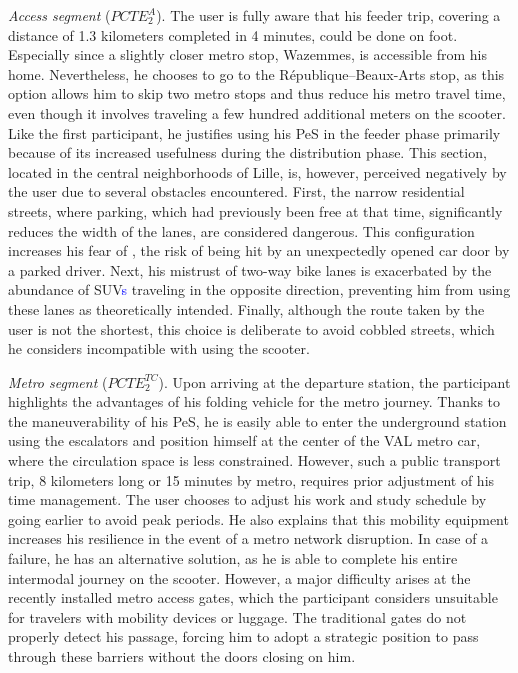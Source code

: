 \begin{refsegment}
\textsl{Access segment} (\(PCTE^{A}_{2}\)). The user is fully aware that his feeder trip, covering a distance of 1.3 kilometers completed in 4 minutes, could be done on foot. Especially since a slightly closer metro stop, Wazemmes, is accessible from his home. Nevertheless, he chooses to go to the République–Beaux-Arts stop, as this option allows him to skip two metro stops and thus reduce his metro travel time, even though it involves traveling a few hundred additional meters on the scooter. Like the first participant, he justifies using his \acrshort{PeS} in the feeder phase primarily because of its increased usefulness during the distribution phase. This section, located in the central neighborhoods of Lille, is, however, perceived negatively by the user due to several obstacles encountered. First, the narrow residential streets, where parking, which had previously been free at that time, significantly reduces the width of the lanes, are considered dangerous. This configuration increases his fear of , the risk of being hit by an unexpectedly opened car door by a parked driver. Next, his mistrust of two-way bike lanes is exacerbated by the abundance of \acrshort{SUV}\textcolor{blue}{s} traveling in the opposite direction, preventing him from using these lanes as theoretically intended. Finally, although the route taken by the user is not the shortest, this choice is deliberate to avoid cobbled streets, which he considers incompatible with using the scooter.%

\textsl{Metro segment} (\(PCTE^{TC}_{2}\)). Upon arriving at the departure station, the participant highlights the advantages of his folding vehicle for the metro journey. Thanks to the maneuverability of his \acrshort{PeS}, he is easily able to enter the underground station using the escalators and position himself at the center of the \acrshort{VAL} metro car, where the circulation space is less constrained. However, such a public transport trip, 8 kilometers long or 15 minutes by metro, requires prior adjustment of his time management. The user chooses to adjust his work and study schedule by going earlier to avoid peak periods. He also explains that this mobility equipment increases his resilience in the event of a metro network disruption. In case of a failure, he has an alternative solution, as he is able to complete his entire intermodal journey on the scooter. However, a major difficulty arises at the recently installed metro access gates, which the participant considers unsuitable for travelers with mobility devices or luggage. The traditional gates do not properly detect his passage, forcing him to adopt a strategic position to pass through these barriers without the doors closing on him.%


\end{refsegment}
